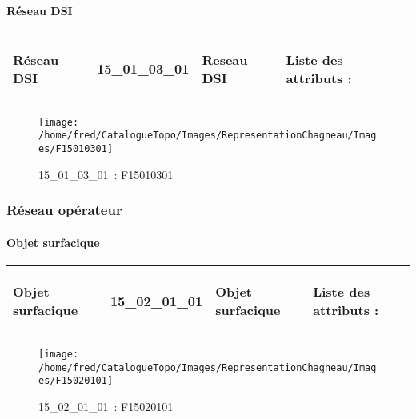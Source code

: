 \documentclass[12pt,titlepage,oneside]{book}
\begin{document}
\paragraph{Réseau DSI}
\noindent
\vspace{\baselineskip}

\renewcommand{\arraystretch}{1.2}
\begin{supertabular}{|p{10cm}|c|p{13cm}|p{12cm}|}
 Réseau DSI & 15\_01\_03\_01 & Reseau DSI & Liste des attributs :
\begin{enumerate}
\end{enumerate}
\\
\hline
\end{supertabular}
\begin{figure}[h!]
  \hfill         %
  \begin{minipage}[t]{3cm}
    \begin{center}
      \texttt{[image: /home/fred/CatalogueTopo/Images/RepresentationChagneau/Images/F15010301]}
      \caption[~15\_01\_03\_01]{\small{15\_01\_03\_01~:} \tiny{F15010301}}\label{F15010301}
    \end{center}
  \end{minipage}
\end{figure}

\subsubsection{\large Réseau opérateur}
\paragraph{Objet surfacique}
\noindent
\vspace{\baselineskip}

\renewcommand{\arraystretch}{1.2}
\begin{supertabular}{|p{10cm}|c|p{13cm}|p{12cm}|}
 Objet surfacique & 15\_02\_01\_01 & Objet surfacique & Liste des attributs :
\begin{enumerate}
\end{enumerate}
\\
\hline
\end{supertabular}
\begin{figure}[h!]
  \hfill         %
  \begin{minipage}[t]{3cm}
    \begin{center}
      \texttt{[image: /home/fred/CatalogueTopo/Images/RepresentationChagneau/Images/F15020101]}
      \caption[~15\_02\_01\_01]{\small{15\_02\_01\_01~:} \tiny{F15020101}}\label{F15020101}
    \end{center}
  \end{minipage}
\end{figure}
\end{document}
